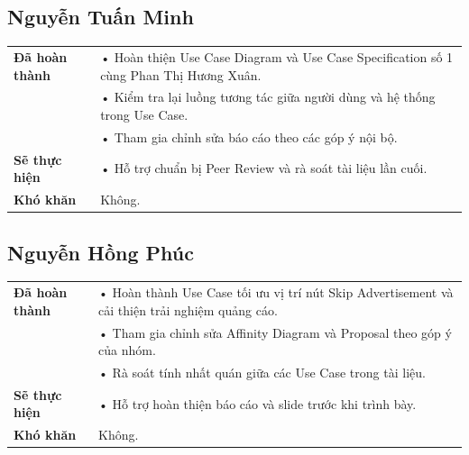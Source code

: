 \documentclass[11pt,a4paper]{article}
\begin{document}

\subsection*{Nguyễn Tuấn Minh}

\begin{tabularx}{\textwidth}{|p{4cm}|X|}
\hline
\textbf{Đã hoàn thành} &
• Hoàn thiện Use Case Diagram và Use Case Specification số 1 cùng Phan Thị Hương Xuân.\\
&
• Kiểm tra lại luồng tương tác giữa người dùng và hệ thống trong Use Case.\\
&
• Tham gia chỉnh sửa báo cáo theo các góp ý nội bộ.\\
\hline

\textbf{Sẽ thực hiện} &
• Hỗ trợ chuẩn bị Peer Review và rà soát tài liệu lần cuối.\\
\hline

\textbf{Khó khăn} &
Không.\\
\hline
\end{tabularx}

\vspace{0.6cm}


\subsection*{Nguyễn Hồng Phúc}

\begin{tabularx}{\textwidth}{|p{4cm}|X|}
\hline
\textbf{Đã hoàn thành} &
• Hoàn thành Use Case tối ưu vị trí nút Skip Advertisement và cải thiện trải nghiệm quảng cáo.\\
&
• Tham gia chỉnh sửa Affinity Diagram và Proposal theo góp ý của nhóm.\\
&
• Rà soát tính nhất quán giữa các Use Case trong tài liệu.\\
\hline

\textbf{Sẽ thực hiện} &
• Hỗ trợ hoàn thiện báo cáo và slide trước khi trình bày.\\
\hline

\textbf{Khó khăn} &
Không.\\
\hline
\end{tabularx}

\vspace{0.8cm}

\end{document}
